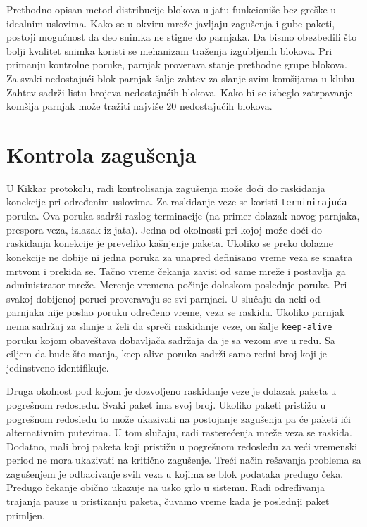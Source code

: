 \documentclass[12pt,oneside]{memoir}
\begin{document}
Prethodno opisan metod distribucije blokova u jatu funkcioniše bez greške u idealnim uslovima.
Kako se u okviru mreže javljaju zagušenja i gube paketi, postoji mogućnost da deo snimka ne stigne do parnjaka. Da bismo obezbedili što bolji kvalitet snimka koristi se mehanizam traženja izgubljenih blokova. Pri primanju kontrolne poruke, parnjak proverava stanje prethodne grupe blokova. Za svaki nedostajući blok parnjak šalje zahtev za slanje svim komšijama u klubu. Zahtev sadrži listu brojeva nedostajućih blokova. Kako bi se izbeglo zatrpavanje komšija parnjak može tražiti najviše 20 nedostajućih blokova.
 
 
\section{Kontrola zagušenja}
\label{Kikkar.4}

U Kikkar protokolu, radi kontrolisanja zagušenja može doći do raskidanja konekcije pri određenim uslovima. Za raskidanje veze se koristi \texttt{terminirajuća} poruka. Ova poruka sadrži razlog terminacije (na primer dolazak novog parnjaka, prespora veza, izlazak iz jata). Jedna od okolnosti pri kojoj može doći do raskidanja konekcije je preveliko kašnjenje paketa. Ukoliko se preko dolazne konekcije ne dobije ni jedna poruka za unapred definisano vreme veza se smatra mrtvom i prekida se. Tačno vreme čekanja zavisi od same mreže i postavlja ga administrator mreže. Merenje vremena počinje dolaskom poslednje poruke. Pri svakoj dobijenoj poruci proveravaju se svi parnjaci. U slučaju da neki od parnjaka nije poslao poruku određeno vreme, veza se raskida. Ukoliko parnjak nema sadržaj za slanje a želi da spreči raskidanje veze, on šalje \texttt{keep-alive} poruku kojom obaveštava dobavljača sadržaja da je sa vezom sve u redu. Sa ciljem da bude što manja, keep-alive poruka sadrži samo redni broj koji je jedinstveno identifikuje. 

Druga okolnost pod kojom je dozvoljeno raskidanje veze je dolazak paketa u pogrešnom redosledu. Svaki paket ima svoj broj. Ukoliko paketi pristižu u pogrešnom redosledu to može ukazivati na postojanje zagušenja pa će paketi ići alternativnim putevima. U tom slučaju, radi rasterećenja mreže veza se raskida. Dodatno, mali broj paketa koji pristižu u pogrešnom redosledu za veći vremenski period ne mora ukazivati na kritično zagušenje. Treći način rešavanja problema sa zagušenjem je odbacivanje svih veza u kojima se blok podataka predugo čeka. Predugo čekanje obično ukazuje na usko grlo u sistemu. Radi određivanja trajanja pauze u pristizanju paketa, čuvamo vreme kada je poslednji paket primljen.
\end{document}
